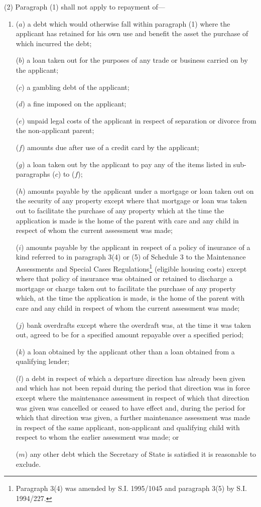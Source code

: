 \documentclass[a4paper]{article}
\begin{document}
(2) Paragraph (1) shall not apply to repayment of—
\begin{enumerate}\item[]
($a$) a debt which would otherwise fall within paragraph (1) where the applicant has retained for his own use and benefit the asset the purchase of which incurred the debt;

($b$) a loan taken out for the purposes of any trade or business carried on by the applicant;

($c$) a gambling debt of the applicant;

($d$) a fine imposed on the applicant;

($e$) unpaid legal costs of the applicant in respect of separation or divorce from the non-applicant parent;

($f$) amounts due after use of a credit card by the applicant;

($g$) a loan taken out by the applicant to pay any of the items listed in sub-paragraphs ($c$) to ($f$);

($h$) amounts payable by the applicant under a mortgage or loan taken out on the security of any property except where that mortgage or loan was taken out to facilitate the purchase of any property which at the time the application is made is the home of the parent with care and any child in respect of whom the current assessment was made;

($i$) amounts payable by the applicant in respect of a policy of insurance of a kind referred to in paragraph 3(4) or (5) of Schedule 3 to the Maintenance Assessments and Special Cases Regulations\footnote{\frenchspacing Paragraph 3(4) was amended by S.I. 1995/1045 and paragraph 3(5) by S.I. 1994/227.} (eligible housing costs) except where that policy of insurance was obtained or retained to discharge a mortgage or charge taken out to facilitate the purchase of any property which, at the time the application is made, is the home of the parent with care and any child in respect of whom the current assessment was made;

($j$) bank overdrafts except where the overdraft was, at the time it was taken out, agreed to be for a specified amount repayable over a specified period;

($k$) a loan obtained by the applicant other than a loan obtained from a qualifying lender;

($l$) a debt in respect of which a departure direction has already been given and which has not been repaid during the period that direction was in force except where the maintenance assessment in respect of which that direction was given was cancelled or ceased to have effect and, during the period for which that direction was given, a further maintenance assessment was made in respect of the same applicant, non-applicant and qualifying child with respect to whom the earlier assessment was made; or

($m$) any other debt which the Secretary of State is satisfied it is reasonable to exclude.
\end{enumerate}
\end{document}

